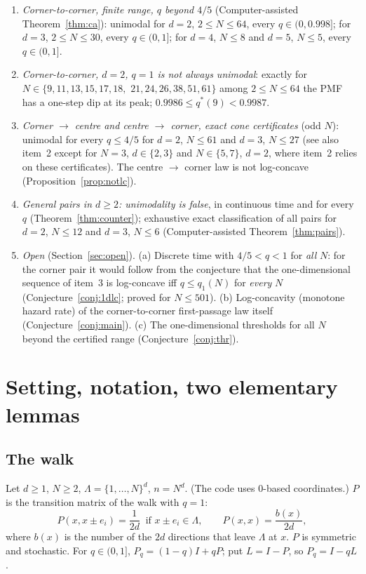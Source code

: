 \documentclass[11pt,a4paper]{article}
\theoremstyle{definition}
\begin{document}
\begin{enumerate}
\item \emph{Corner-to-corner, finite range, $q$ beyond $4/5$} (Computer-assisted Theorem~\ref{thm:ca}): unimodal for $d=2$, $2\le N\le64$, every $q\in(0,0.998]$; for $d=3$, $2\le N\le30$, every $q\in(0,1]$; for $d=4$, $N\le8$ and $d=5$, $N\le5$, every $q\in(0,1]$.
\item \emph{Corner-to-corner, $d=2$, $q=1$ is not always unimodal}: exactly for $N\in\{9,11,13,15,17,18,$ $21,24,26,38,51,61\}$ among $2\le N\le64$ the PMF has a one-step dip at its peak; $0.9986\le q^*(9)<0.9987$.
\item \emph{Corner $\to$ centre and centre $\to$ corner, exact cone certificates} (odd $N$): unimodal for every $q\le4/5$ for $d=2$, $N\le61$ and $d=3$, $N\le27$ (see also item~2 except for $N=3$, $d\in\{2,3\}$ and $N\in\{5,7\}$, $d=2$, where item~2 relies on these certificates). The centre $\to$ corner law is not log-concave (Proposition~\ref{prop:notlc}).
\item \emph{General pairs in $d\ge2$: unimodality is false}, in continuous time and for every $q$ (Theorem~\ref{thm:counter}); exhaustive exact classification of all pairs for $d=2$, $N\le12$ and $d=3$, $N\le6$ (Computer-assisted Theorem~\ref{thm:pairs}).
\item \emph{Open} (Section~\ref{sec:open}). (a) Discrete time with $4/5<q<1$ for \emph{all} $N$: for the corner pair it would follow from the conjecture that the one-dimensional sequence of item~3 is log-concave iff $q\le q_1(N)$ for \emph{every} $N$ (Conjecture~\ref{conj:1dlc}; proved for $N\le501$). (b) Log-concavity (monotone hazard rate) of the corner-to-corner first-passage law itself (Conjecture~\ref{conj:main}). (c) The one-dimensional thresholds for all $N$ beyond the certified range (Conjecture~\ref{conj:thr}).
\end{enumerate}

\section{Setting, notation, two elementary lemmas}\label{sec:setting}

\subsection{The walk}
Let $d\ge1$, $N\ge2$, $\Lambda=\{1,\dots,N\}^d$, $n=N^d$. (The code uses $0$-based coordinates.) $P$ is the transition matrix of the walk with $q=1$:
\[
P(x,x\pm e_i)=\frac1{2d}\ \text{ if }x\pm e_i\in\Lambda,\qquad P(x,x)=\frac{b(x)}{2d},
\]
where $b(x)$ is the number of the $2d$ directions that leave $\Lambda$ at $x$. $P$ is symmetric and stochastic. For $q\in(0,1]$, $P_q=(1-q)I+qP$; put $L=I-P$, so $P_q=I-qL$.
\end{document}
